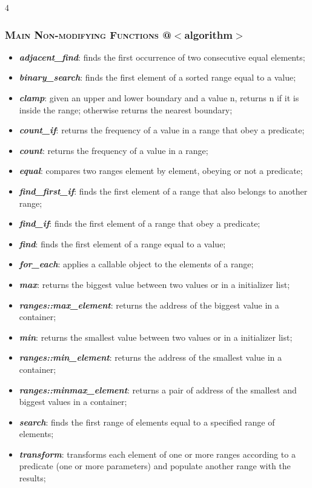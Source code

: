 \documentclass[10pt]{article}
\begin{document}
\begin{multicols*}{4}
{\subsubsection*{\textsc{Main Non-modifying Functions} @$<$algorithm$>$} 
\begin{itemize}[leftmargin=*,topsep=0.25pt]
  \setlength\itemsep{-1.8pt}
	\item  \emph{\textbf{adjacent\_find}}: finds the first occurrence of two consecutive equal elements;
	\item  \emph{\textbf{binary\_search}}: finds the first element of a sorted range equal to a value;  
	\item  \emph{\textbf{clamp}}: given an upper and lower boundary and a value n, returns n if it is inside the range; otherwise returns the nearest boundary;  
	\item  \emph{\textbf{count\_if}}: returns the frequency of a value in a range that obey a predicate;
	\item  \emph{\textbf{count}}: returns the frequency of a value in a range; 
	\item  \emph{\textbf{equal}}: compares two ranges element by element, obeying or not a predicate;  
	\item  \emph{\textbf{find\_first\_if}}: finds the first element of a range that also belongs to another range;  
	\item  \emph{\textbf{find\_if}}: finds the first element of a range that obey a predicate;
	\item  \emph{\textbf{find}}: finds the first element of a range equal to a value; 
	\item  \emph{\textbf{for\_each}}: applies a callable object to the elements of a range;
	\item  \emph{\textbf{max}}: returns the biggest value between two values or in a initializer list;  
	\item  \emph{\textbf{ranges::max\_element}}: returns the address of the biggest value in a container;  
	\item  \emph{\textbf{min}}: returns the smallest value between two values or in a initializer list;  
	\item  \emph{\textbf{ranges::min\_element}}: returns the address of the smallest value in a container;  
	\item  \emph{\textbf{ranges::minmax\_element}}: returns a pair of address of the smallest and biggest values in a container;  	
	\item  \emph{\textbf{search}}: finds the first range of elements equal to a specified range of elements;  
	\item  \emph{\textbf{transform}}: transforms each element of one or more ranges according to a predicate (one or more parameters) and populate another range with the results;  
\end{itemize}


}
\end{multicols*}
\end{document}
